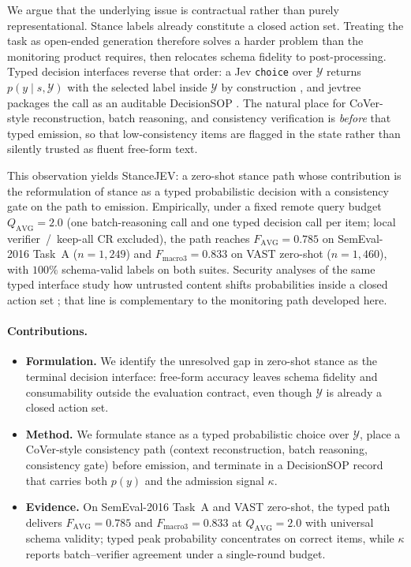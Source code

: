 \documentclass[10pt]{article}
\theoremstyle{definition}
\begin{document}
We argue that the underlying issue is contractual rather than purely representational.
Stance labels already constitute a closed action set.
Treating the task as open-ended generation therefore solves a harder problem than the monitoring product
requires, then relocates schema fidelity to post-processing.
Typed decision interfaces reverse that order: a Jev \texttt{choice} over $\mathcal{Y}$ returns
$p(y\mid s,\mathcal{Y})$ with the selected label inside $\mathcal{Y}$ by construction
\cite{typesafe2026systemone,typesafe2026jev,openrouter2026jev}, and jevtree packages the call as an
auditable DecisionSOP \cite{jevtree2026}.
The natural place for CoVer-style reconstruction, batch reasoning, and consistency verification is
\emph{before} that typed emission, so that low-consistency items are flagged in the state rather than silently
trusted as fluent free-form text.

This observation yields StanceJEV: a zero-shot stance path whose contribution is the reformulation of stance
as a typed probabilistic decision with a consistency gate on the path to emission.
Empirically, under a fixed remote query budget $Q_{\mathrm{AVG}}{=}2.0$ (one batch-reasoning call and one typed
decision call per item; local verifier~/~keep-all CR excluded), the path reaches $F_{\mathrm{AVG}}{=}0.785$ on SemEval-2016 Task~A
($n{=}1{,}249$) and $F_{\mathrm{macro3}}{=}0.833$ on VAST zero-shot ($n{=}1{,}460$), with $100\%$
schema-valid labels on both suites.
Security analyses of the same typed interface study how untrusted content shifts probabilities inside a closed
action set \cite{wu2026decisionhijacking}; that line is complementary to the monitoring path developed here.

\paragraph{Contributions.}
\begin{itemize}
\item \textbf{Formulation.}
  We identify the unresolved gap in zero-shot stance as the terminal decision interface: free-form accuracy
  leaves schema fidelity and consumability outside the evaluation contract, even though $\mathcal{Y}$ is
  already a closed action set.
\item \textbf{Method.}
  We formulate stance as a typed probabilistic choice over $\mathcal{Y}$, place a CoVer-style consistency
  path (context reconstruction, batch reasoning, consistency gate) before emission, and terminate in a
  DecisionSOP record that carries both $p(y)$ and the admission signal $\kappa$.
\item \textbf{Evidence.}
  On SemEval-2016 Task~A and VAST zero-shot, the typed path delivers
  $F_{\mathrm{AVG}}{=}0.785$ and $F_{\mathrm{macro3}}{=}0.833$ at $Q_{\mathrm{AVG}}{=}2.0$ with universal
  schema validity; typed peak probability concentrates on correct items, while $\kappa$ reports
  batch--verifier agreement under a single-round budget.
\end{itemize}
\end{document}
